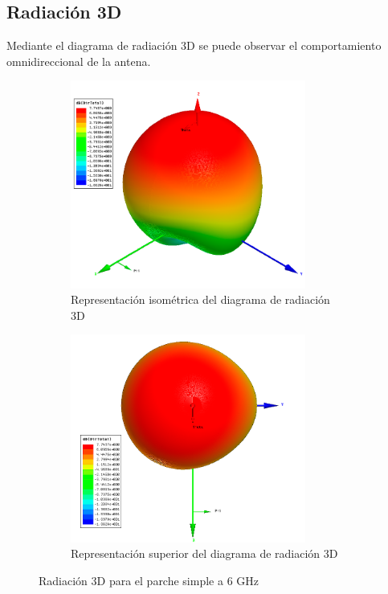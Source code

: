 \newpage
\subsection{Radiación 3D}
\par Mediante el diagrama de radiación 3D se puede observar el comportamiento omnidireccional de la antena. 

\begin{figure}[H]
     \centering
     \begin{subfigure}[b]{0.75\textwidth}
         \centering
         \includegraphics[width=0.85\textwidth]{archivos/analisis/1x12/6}
         \caption{Representación isométrica del diagrama de radiación 3D}
         \label{fig:3d11x12}
     \end{subfigure}
     \hfill
     \begin{subfigure}[b]{0.75\textwidth}
         \centering
         \includegraphics[width=0.85\textwidth]{archivos/analisis/1x12/7}
         \caption{Representación superior del diagrama de radiación 3D}
         \label{fig:3d21x12}
     \end{subfigure}
     \hfill
        \caption{Radiación 3D para el parche simple a 6 GHz}
        \label{fig:3d1x12}
\end{figure}

